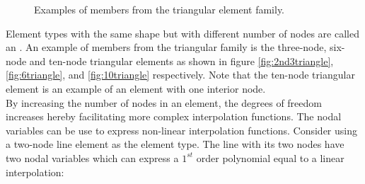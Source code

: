 \begin{figure}
  \centering
  \hspace{10mm}
  \hspace{10mm}
  \caption{Examples of members from the triangular element family.}
  \label{fig:triangle-element-family}
\end{figure}

Element types with the same shape but with different number of nodes
are called an . An example of members from the
triangular family is the three-node, six-node and ten-node triangular
elements as shown in figure \ref{fig:2nd3triangle},
\ref{fig:6triangle}, and \vref{fig:10triangle} respectively. Note that
the ten-node triangular element is an example of an element with one
interior node. \\

By increasing the number of nodes in an element, the degrees of
freedom increases hereby facilitating more complex interpolation
functions. The nodal variables can be use
to express non-linear interpolation functions. Consider using a
two-node line element as the element type. The line with its two nodes
have two nodal variables which can express a $1^{st}$ order polynomial
equal to a linear interpolation:

